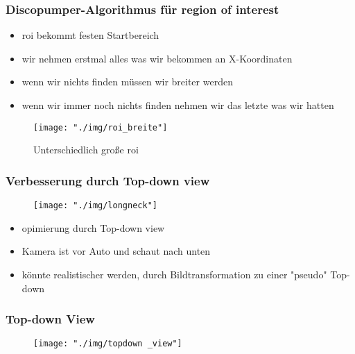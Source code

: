 \documentclass{beamer}
\begin{document}
\begin{frame}

\frametitle{Discopumper-Algorithmus für region of interest}

\begin{itemize}
\item roi bekommt festen Startbereich
\item wir nehmen erstmal alles was wir bekommen an X-Koordinaten
\item wenn wir nichts finden müssen wir breiter werden
\item wenn wir immer noch nichts finden nehmen wir das letzte was wir hatten
\end{itemize}

\begin{center}
\begin{figure}[h]
\centering
\texttt{[image: "./img/roi\_breite"]}
\label{fig:roi}
\caption{Unterschiedlich große roi}
\end{figure}
\end{center}


\end{frame}

\begin{frame}
\frametitle{Verbesserung durch Top-down view}

\begin{center}
\begin{figure}[h]
\centering
\texttt{[image: "./img/longneck"]}
\label{fig:longneck}
\end{figure}
\end{center}

\begin{itemize}
\item opimierung durch Top-down view
\item Kamera ist vor Auto und schaut nach unten
\item könnte realistischer werden, durch Bildtransformation zu einer "pseudo" Top-down 
\end{itemize}
\end{frame}

\begin{frame}
\frametitle{Top-down View}
\begin{center}
\begin{figure}[h]
\centering
\texttt{[image: "./img/topdown \_view"]}
\label{fig:topdown}
\end{figure}
\end{center}
\end{frame}
\end{document}
